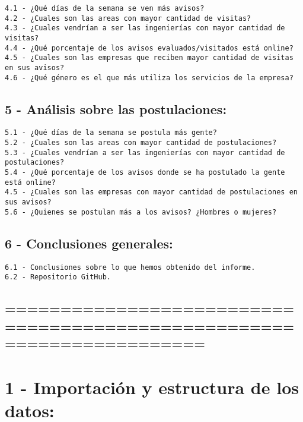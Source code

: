 \documentclass[11pt]{article}
\begin{document}
\begin{verbatim}
4.1 - ¿Qué días de la semana se ven más avisos?
4.2 - ¿Cuales son las areas con mayor cantidad de visitas?
4.3 - ¿Cuales vendrían a ser las ingenierías con mayor cantidad de visitas?
4.4 - ¿Qué porcentaje de los avisos evaluados/visitados está online?
4.5 - ¿Cuales son las empresas que reciben mayor cantidad de visitas en sus avisos?
4.6 - ¿Qué género es el que más utiliza los servicios de la empresa?
\end{verbatim}

\hypertarget{anuxe1lisis-sobre-las-postulaciones}{%
\subsection{5 - Análisis sobre las
postulaciones:}\label{anuxe1lisis-sobre-las-postulaciones}}

\begin{verbatim}
5.1 - ¿Qué días de la semana se postula más gente?
5.2 - ¿Cuales son las areas con mayor cantidad de postulaciones?
5.3 - ¿Cuales vendrían a ser las ingenierías con mayor cantidad de postulaciones?
5.4 - ¿Qué porcentaje de los avisos donde se ha postulado la gente está online?
4.5 - ¿Cuales son las empresas con mayor cantidad de postulaciones en sus avisos?
5.6 - ¿Quienes se postulan más a los avisos? ¿Hombres o mujeres?
\end{verbatim}

\hypertarget{conclusiones-generales}{%
\subsection{6 - Conclusiones generales:}\label{conclusiones-generales}}

\begin{verbatim}
6.1 - Conclusiones sobre lo que hemos obtenido del informe.
6.2 - Repositorio GitHub.
\end{verbatim}

\hypertarget{section-1}{%
\subsection{======================================================================}\label{section-1}}

    \hypertarget{importaciuxf3n-y-estructura-de-los-datos}{%
\section{1 - Importación y estructura de los
datos:}\label{importaciuxf3n-y-estructura-de-los-datos}}
\end{document}
